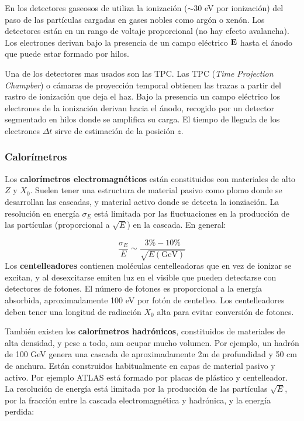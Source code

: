 En los detectores gaseosos de utiliza la ionización ($\sim$30 eV por ionización) del paso de las partículas cargadas en gases nobles como argón o xenón. Los detectores están en un rango de voltaje proporcional (no hay efecto avalancha). Los electrones derivan bajo la presencia de un campo eléctrico $\mathbf{E}$ hasta el ánodo que puede estar formado por hilos.  

Una de los detectores mas usados son las TPC. Las TPC (\textit{Time Projection Champber}) o cámaras de proyección temporal obtienen las trazas a partir del rastro de ionización que deja el haz. Bajo la presencia un campo eléctrico los electrones de la ionización derivan hacia el ánodo, recogido por un detector segmentado en hilos donde se amplifica su carga.  El tiempo de llegada de los electrones $\Delta t$ sirve de estimación de la posición $z$. 

\subsubsection{Calorímetros}

Los \textbf{calorímetros electromagnéticos} están constituidos con materiales de alto $Z$ y $X_0$. Suelen tener una estructura de material pasivo como plomo donde se desarrollan las cascadas, y material activo donde se detecta la ionziación. La resolución en energía $\sigma_E$ está limitada por las fluctuaciones en la producción de las partículas (proporcional a $\sqrt{E}$) en la cascada. En general:

\begin{equation}
	\frac{\sigma_E}{E} \sim \frac{3\% - 10\%}{\sqrt{E(\text{GeV})}}
\end{equation}
Los \textbf{centelleadores} contienen moléculas centelleadoras que en vez de ionizar se excitan, y al desexcitarse emiten luz en el visible que pueden detectarse con detectores de fotones. El número de fotones es proporcional a la energía absorbida, aproximadamente 100 eV por fotón de centelleo. Los centelleadores deben tener una longitud de radiación $X_0$ alta para evitar conversión de fotones.

También existen los \textbf{calorímetros hadrónicos}, constituidos de materiales de alta densidad, y pese a todo, aun ocupar mucho volumen. Por ejemplo, un hadrón de 100 GeV genera una cascada de aproximadamente 2m de profundidad y 50 cm de anchura. Están construidos habitualmente en capas de material pasivo y activo. Por ejemplo ATLAS está formado por placas de plástico y centelleador. La resolución de energía está limitada por la producción de las partículas $\sqrt{E}$, por la fracción entre la cascada electromagnética y hadrónica, y la energía perdida:

